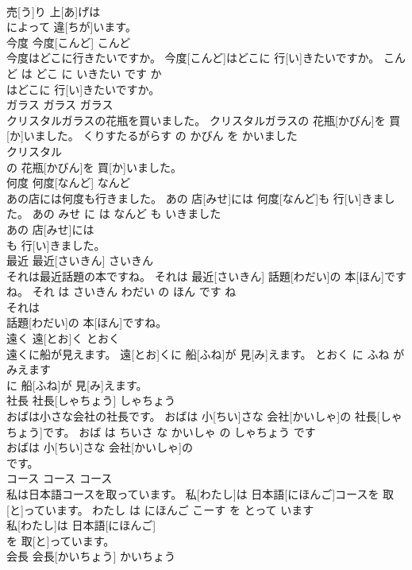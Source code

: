 \documentclass[8pt]{extreport}
\begin{document}
\begin{CJK}{UTF8}{min}
\\	売[う]り 上[あ]げは
\\	によって 違[ちが]います。		
\\	今度	今度[こんど]	こんど	
\\	今度はどこに行きたいですか。	今度[こんど]はどこに 行[い]きたいですか。	こんど は どこ に いきたい です か	
\\	はどこに 行[い]きたいですか。		
\\	ガラス	ガラス	ガラス	
\\	クリスタルガラスの花瓶を買いました。	クリスタルガラスの 花瓶[かびん]を 買[か]いました。	くりすたるがらす の かびん を かいました	
\\	クリスタル
\\	の 花瓶[かびん]を 買[か]いました。		
\\	何度	何度[なんど]	なんど	
\\	あの店には何度も行きました。	あの 店[みせ]には 何度[なんど]も 行[い]きました。	あの みせ に は なんど も いきました	
\\	あの 店[みせ]には
\\	も 行[い]きました。		
\\	最近	最近[さいきん]	さいきん	
\\	それは最近話題の本ですね。	それは 最近[さいきん] 話題[わだい]の 本[ほん]ですね。	それ は さいきん わだい の ほん です ね	
\\	それは
\\	話題[わだい]の 本[ほん]ですね。		
\\	遠く	遠[とお]く	とおく	
\\	遠くに船が見えます。	遠[とお]くに 船[ふね]が 見[み]えます。	とおく に ふね が みえます	
\\	に 船[ふね]が 見[み]えます。		
\\	社長	社長[しゃちょう]	しゃちょう	
\\	おばは小さな会社の社長です。	おばは 小[ちい]さな 会社[かいしゃ]の 社長[しゃちょう]です。	おば は ちいさ な かいしゃ の しゃちょう です	
\\	おばは 小[ちい]さな 会社[かいしゃ]の
\\	です。		
\\	コース	コース	コース	
\\	私は日本語コースを取っています。	私[わたし]は 日本語[にほんご]コースを 取[と]っています。	わたし は にほんご こーす を とって います	
\\	私[わたし]は 日本語[にほんご]
\\	を 取[と]っています。		
\\	会長	会長[かいちょう]	かいちょう	

\end{CJK}
\end{document}
